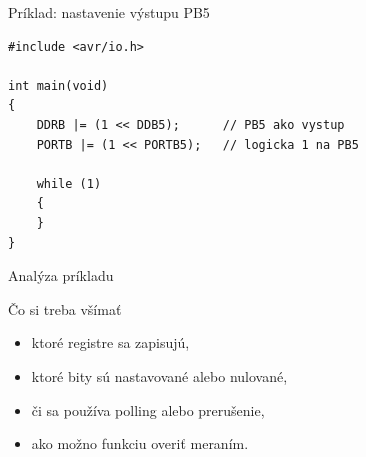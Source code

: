 
\begin{frame}[fragile]{Príklad: nastavenie výstupu PB5}
\begin{lstlisting}[style=avrstyle]
#include <avr/io.h>

int main(void)
{
    DDRB |= (1 << DDB5);      // PB5 ako vystup
    PORTB |= (1 << PORTB5);   // logicka 1 na PB5

    while (1)
    {
    }
}
\end{lstlisting}
\end{frame}

\begin{frame}{Analýza príkladu}
\begin{tukethinbox}{Čo si treba všímať}
\begin{itemize}
    \item ktoré registre sa zapisujú,
    \item ktoré bity sú nastavované alebo nulované,
    \item či sa používa polling alebo prerušenie,
    \item ako možno funkciu overiť meraním.
\end{itemize}
\end{tukethinbox}
\end{frame}
